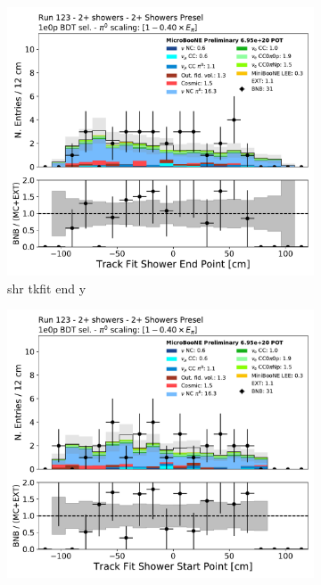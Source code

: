 \begin{figure}[H]
    \centering
    \begin{subfigure}{0.3\textwidth}
    \includegraphics[width=1.0\textwidth]{Sidebands/Figures/TwoShr_1e0pSel/BDT/shr_trk_sce_end_y.pdf}
    \caption{shr tkfit end y}
    \end{subfigure}
    \begin{subfigure}{0.3\textwidth}
    \includegraphics[width=1.0\textwidth]{Sidebands/Figures/TwoShr_1e0pSel/BDT/shr_trk_sce_start_y.pdf}

\end{subfigure}
\end{figure}
